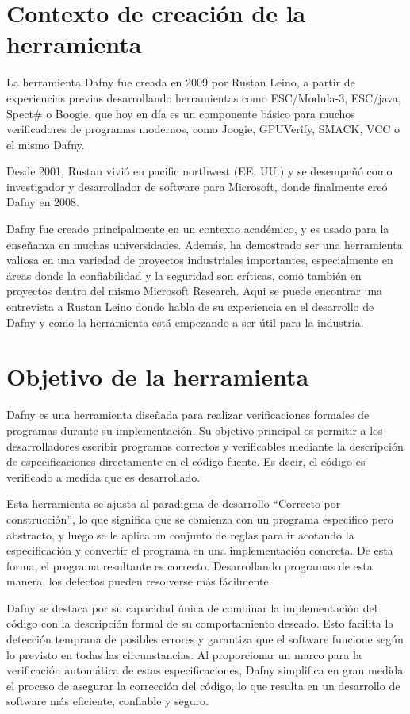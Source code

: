 \documentclass[runningheads]{llncs}
\begin{document}
\section{Contexto de creación de la herramienta}

La herramienta Dafny fue creada en 2009 por Rustan Leino,
a partir de experiencias previas desarrollando herramientas como ESC/Modula-3, ESC/java, Spect\# o Boogie,
que hoy en día es un componente básico para muchos verificadores de programas modernos,
como Joogie, GPUVerify, SMACK, VCC o el mismo Dafny.

Desde 2001, Rustan vivió en pacific northwest (EE. UU.) y se desempeñó como investigador y desarrollador de software para Microsoft,
donde finalmente creó Dafny en 2008.

Dafny fue creado principalmente en un contexto académico, 
y es usado para la enseñanza en muchas universidades.
Además, ha demostrado ser una herramienta valiosa en una variedad de proyectos industriales importantes, 
especialmente en áreas donde la confiabilidad y la seguridad son críticas, 
como también en proyectos dentro del mismo Microsoft Research.
Aqui\cite{EntrevistaLeino} se puede encontrar una entrevista a Rustan Leino donde habla de su experiencia en el desarrollo de Dafny y 
como la herramienta está empezando a ser útil para la industria.

\section{Objetivo de la herramienta}

Dafny es una herramienta diseñada para realizar verificaciones formales de programas durante su implementación.
Su objetivo principal es permitir a los desarrolladores escribir programas correctos y verificables mediante la descripción
de especificaciones directamente en el código fuente. Es decir, el código es verificado a medida que es desarrollado.

Esta herramienta se ajusta al paradigma de desarrollo ``Correcto por construcción'', lo que significa que se comienza
con un programa específico pero abstracto, y luego se le aplica un conjunto de reglas para ir acotando la especificación
y convertir el programa en una implementación concreta. De esta forma, el programa resultante es correcto.
Desarrollando programas de esta manera, los defectos pueden resolverse más fácilmente.

Dafny se destaca por su capacidad única de combinar la implementación del código con la descripción formal de su comportamiento
deseado. Esto facilita la detección temprana de posibles errores y garantiza que el software funcione según lo previsto en todas
las circunstancias. Al proporcionar un marco para la verificación automática de estas especificaciones, Dafny simplifica en gran
medida el proceso de asegurar la corrección del código, lo que resulta en un desarrollo de software más eficiente, confiable y seguro.
\end{document}
